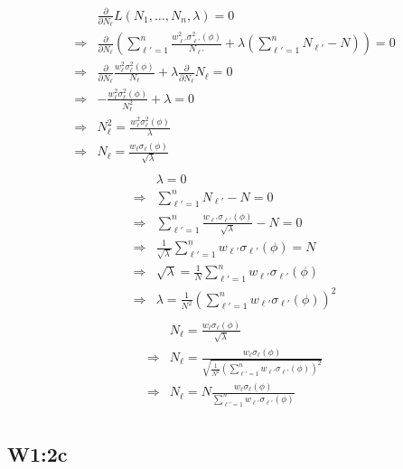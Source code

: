 \documentclass{article}
\begin{document}
\begin{align*}
   & \frac{\partial}{\partial N_\ell} L(N_1,\ldots,N_n,\lambda) = 0 \\
   \Rightarrow& \frac{\partial}{\partial N_\ell} \left(\sum_{\ell'=1}^n \frac{w_{\ell'}^2\sigma_{\ell'}^2(\phi)}{N_{\ell'}}+\lambda\left(\sum_{\ell'=1}^n N_{\ell'} - N\right)\right) = 0 \\
   \Rightarrow&  \frac{\partial}{\partial N_\ell}\frac{w_{\ell}^2\sigma_{\ell}^2(\phi)}{N_{\ell}}+\lambda \frac{\partial}{\partial N_\ell}N_{\ell} = 0 \\
   \Rightarrow&  -\frac{w_{\ell}^2\sigma_{\ell}^2(\phi)}{N_{\ell}^2}+\lambda  = 0 \\
   \Rightarrow& N_\ell^2 = \frac{w_{\ell}^2\sigma_{\ell}^2(\phi)}{\lambda} \\
   \Rightarrow& N_\ell = \frac{w_{\ell}\sigma_{\ell}(\phi)}{\sqrt\lambda} \\
\end{align*}
\begin{align*}
   & \lambda = 0 \\
   \Rightarrow& \sum_{\ell'=1}^n N_{\ell'} - N = 0 \\
   \Rightarrow& \sum_{\ell'=1}^n \frac{w_{\ell'}\sigma_{\ell'}(\phi)}{\sqrt\lambda} - N = 0 \\
   \Rightarrow& \frac{1}{\sqrt\lambda}\sum_{\ell'=1}^n w_{\ell'}\sigma_{\ell'}(\phi) = N \\
   \Rightarrow& \sqrt{\lambda} = \frac{1}{N}\sum_{\ell'=1}^n w_{\ell'}\sigma_{\ell'}(\phi) \\
   \Rightarrow& \lambda = \frac{1}{N^2}\left(\sum_{\ell'=1}^n w_{\ell'}\sigma_{\ell'}(\phi)\right)^2 \\
\end{align*}
\begin{align*}
   & N_\ell = \frac{w_{\ell}\sigma_{\ell}(\phi)}{\sqrt\lambda} \\
   \Rightarrow& N_\ell = \frac{w_{\ell}\sigma_{\ell}(\phi)}{\sqrt{\frac{1}{N^2}\left(\sum_{\ell'=1}^n w_{\ell'}\sigma_{\ell'}(\phi)\right)^2}} \\
   \Rightarrow& N_\ell = N\frac{w_{\ell}\sigma_{\ell}(\phi)}{\sum_{\ell'=1}^n w_{\ell'}\sigma_{\ell'}(\phi)} \\
\end{align*}

\subsection{W1:2c}
\end{document}
